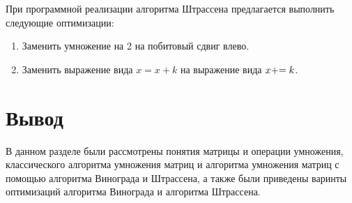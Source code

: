 При программной реализации алгоритма Штрассена предлагается выполнить следующие оптимизации: 

\begin{enumerate}[label={\arabic*)}]
	\item Заменить умножение на 2 на побитовый сдвиг влево.
	\item Заменить выражение вида $x = x + k$ на выражение вида $x +\kern-0.25em= k$.
\end{enumerate}

\section*{Вывод}

В данном разделе были рассмотрены понятия матрицы и операции умножения, классического алгоритма умножения матриц и алгоритма умножения матриц с помощью алгоритма Винограда и Штрассена, а также были приведены варинты оптимизаций алгоритма Винограда и алгоритма Штрассена.

